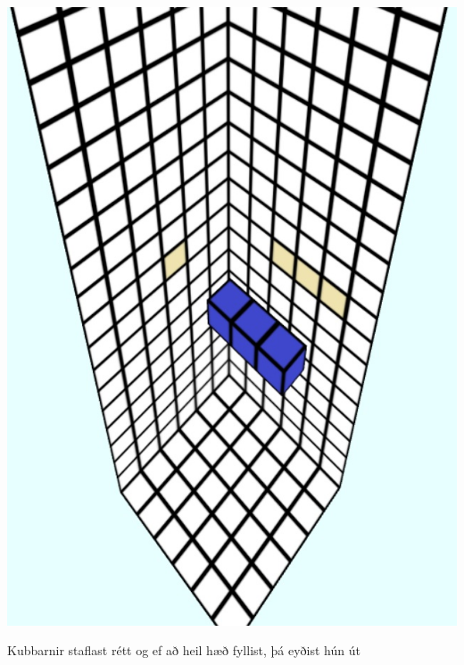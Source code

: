 \documentclass[12pt]{article}
\begin{document}
\begin{small}
\begin{center}
\includegraphics[scale=0.4]{m5}
\end{center}
Kubbarnir staflast rétt og ef að heil hæð fyllist, þá eyðist hún út
\begin{center}

\end{center}
\end{small}
\end{document}
